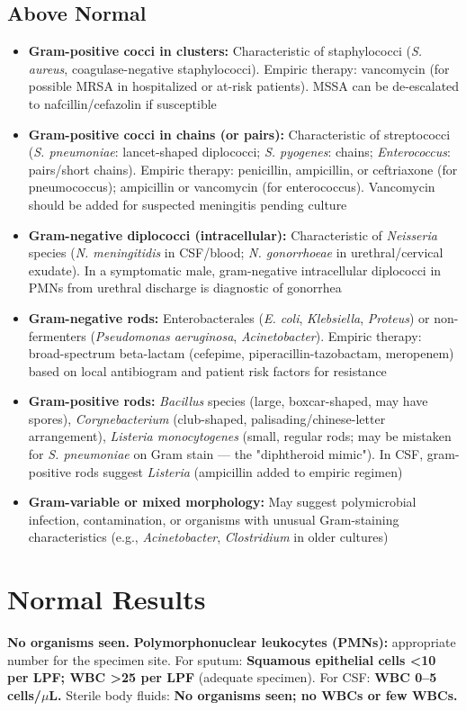 \subsection*{Above Normal}
\begin{itemize}
  \item \textbf{Gram-positive cocci in clusters:} Characteristic of staphylococci (\textit{S. aureus}, coagulase-negative staphylococci). Empiric therapy: vancomycin (for possible MRSA in hospitalized or at-risk patients). MSSA can be de-escalated to nafcillin/cefazolin if susceptible
  \item \textbf{Gram-positive cocci in chains (or pairs):} Characteristic of streptococci (\textit{S. pneumoniae}: lancet-shaped diplococci; \textit{S. pyogenes}: chains; \textit{Enterococcus}: pairs/short chains). Empiric therapy: penicillin, ampicillin, or ceftriaxone (for pneumococcus); ampicillin or vancomycin (for enterococcus). Vancomycin should be added for suspected meningitis pending culture
  \item \textbf{Gram-negative diplococci (intracellular):} Characteristic of \textit{Neisseria} species (\textit{N. meningitidis} in CSF/blood; \textit{N. gonorrhoeae} in urethral/cervical exudate). In a symptomatic male, gram-negative intracellular diplococci in PMNs from urethral discharge is diagnostic of gonorrhea
  \item \textbf{Gram-negative rods:} Enterobacterales (\textit{E. coli}, \textit{Klebsiella}, \textit{Proteus}) or non-fermenters (\textit{Pseudomonas aeruginosa}, \textit{Acinetobacter}). Empiric therapy: broad-spectrum beta-lactam (cefepime, piperacillin-tazobactam, meropenem) based on local antibiogram and patient risk factors for resistance
  \item \textbf{Gram-positive rods:} \textit{Bacillus} species (large, boxcar-shaped, may have spores), \textit{Corynebacterium} (club-shaped, palisading/chinese-letter arrangement), \textit{Listeria monocytogenes} (small, regular rods; may be mistaken for \textit{S. pneumoniae} on Gram stain --- the "diphtheroid mimic"). In CSF, gram-positive rods suggest \textit{Listeria} (ampicillin added to empiric regimen)
  \item \textbf{Gram-variable or mixed morphology:} May suggest polymicrobial infection, contamination, or organisms with unusual Gram-staining characteristics (e.g., \textit{Acinetobacter}, \textit{Clostridium} in older cultures)
\end{itemize}

\section*{Normal Results}
\textbf{No organisms seen.} \textbf{Polymorphonuclear leukocytes (PMNs):} appropriate number for the specimen site. For sputum: \textbf{Squamous epithelial cells <10 per LPF; WBC >25 per LPF} (adequate specimen). For CSF: \textbf{WBC 0--5 cells/$\mu$L.} Sterile body fluids: \textbf{No organisms seen; no WBCs or few WBCs.}

